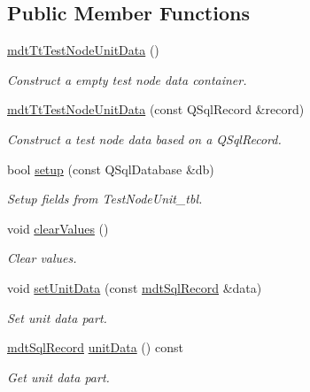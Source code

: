 \subsection*{Public Member Functions}
\begin{DoxyCompactItemize}
\item 
\hyperlink{classmdt_tt_test_node_unit_data_ab50920d5dc8058e41f79f5f0a72e1e3d}{mdt\-Tt\-Test\-Node\-Unit\-Data} ()
\begin{DoxyCompactList}\small\item\em Construct a empty test node data container. \end{DoxyCompactList}\item 
\hyperlink{classmdt_tt_test_node_unit_data_a149a8299df5a78daa85f49c680a41e21}{mdt\-Tt\-Test\-Node\-Unit\-Data} (const Q\-Sql\-Record \&record)
\begin{DoxyCompactList}\small\item\em Construct a test node data based on a Q\-Sql\-Record. \end{DoxyCompactList}\item 
bool \hyperlink{classmdt_tt_test_node_unit_data_a09666f9fa0c3ea510eef5cda432f1166}{setup} (const Q\-Sql\-Database \&db)
\begin{DoxyCompactList}\small\item\em Setup fields from Test\-Node\-Unit\-\_\-tbl. \end{DoxyCompactList}\item 
void \hyperlink{classmdt_tt_test_node_unit_data_a774da621d18566dcf42329664a356cad}{clear\-Values} ()
\begin{DoxyCompactList}\small\item\em Clear values. \end{DoxyCompactList}\item 
void \hyperlink{classmdt_tt_test_node_unit_data_a51e6a518bda41df4f4a68fee0fbff472}{set\-Unit\-Data} (const \hyperlink{classmdt_sql_record}{mdt\-Sql\-Record} \&data)
\begin{DoxyCompactList}\small\item\em Set unit data part. \end{DoxyCompactList}\item 
\hyperlink{classmdt_sql_record}{mdt\-Sql\-Record} \hyperlink{classmdt_tt_test_node_unit_data_afc769bf48aa7068a08b57330a509b566}{unit\-Data} () const 
\begin{DoxyCompactList}\small\item\em Get unit data part. \end{DoxyCompactList}\end{DoxyCompactItemize}
